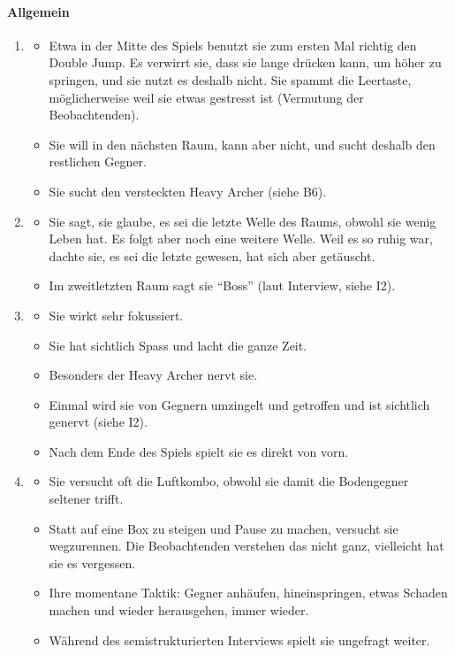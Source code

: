 \documentclass[../Main.tex]{subfiles}
\begin{document}
\paragraph{Allgemein}
\begin{enumerate}[label=\textbf{B\arabic*}, leftmargin=1.5cm, itemsep=0.8em, resume]
\item
\begin{itemize}[nosep]
    \item Etwa in der Mitte des Spiels benutzt sie zum ersten Mal richtig den Double Jump. Es verwirrt sie, dass sie lange drücken kann, um höher zu springen, und sie nutzt es deshalb nicht. Sie spammt die Leertaste, möglicherweise weil sie etwas gestresst ist (Vermutung der Beobachtenden).
    \item Sie will in den nächsten Raum, kann aber nicht, und sucht deshalb den restlichen Gegner.
    \item Sie sucht den versteckten Heavy Archer (siehe B6).
\end{itemize}

\item
\begin{itemize}[nosep]
    \item Sie sagt, sie glaube, es sei die letzte Welle des Raums, obwohl sie wenig Leben hat. Es folgt aber noch eine weitere Welle. Weil es so ruhig war, dachte sie, es sei die letzte gewesen, hat sich aber getäuscht.
    \item Im zweitletzten Raum sagt sie \enquote{Boss} (laut Interview, siehe I2).
\end{itemize}

\item
\begin{itemize}[nosep]
    \item Sie wirkt sehr fokussiert.
    \item Sie hat sichtlich Spass und lacht die ganze Zeit.
    \item Besonders der Heavy Archer nervt sie.
    \item Einmal wird sie von Gegnern umzingelt und getroffen und ist sichtlich genervt (siehe I2).
    \item Nach dem Ende des Spiels spielt sie es direkt von vorn.
\end{itemize}

\item
\begin{itemize}[nosep]
    \item Sie versucht oft die Luftkombo, obwohl sie damit die Bodengegner seltener trifft.
    \item Statt auf eine Box zu steigen und Pause zu machen, versucht sie wegzurennen. Die Beobachtenden verstehen das nicht ganz, vielleicht hat sie es vergessen.
    \item Ihre momentane Taktik: Gegner anhäufen, hineinspringen, etwas Schaden machen und wieder herausgehen, immer wieder.
    \item Während des semistrukturierten Interviews spielt sie ungefragt weiter.
\end{itemize}


\end{enumerate}
\end{document}
